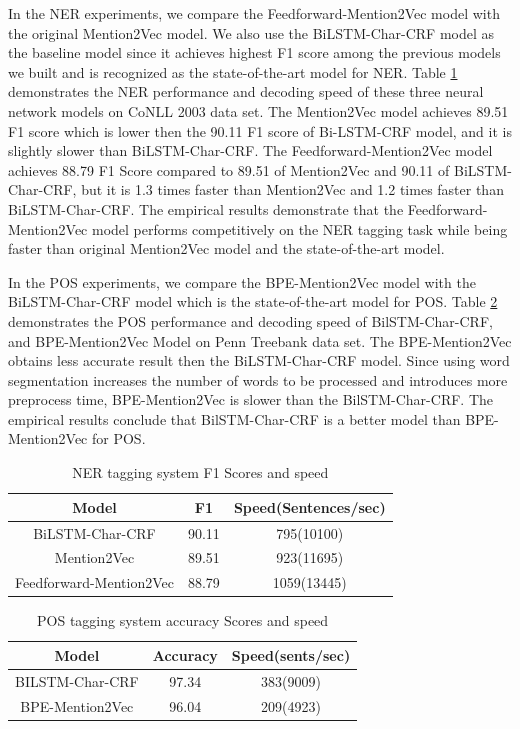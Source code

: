 \documentclass{sfuthesis}
\begin{document}
In the NER experiments, we compare the Feedforward-Mention2Vec model with the original Mention2Vec model. We also use the BiLSTM-Char-CRF model as the baseline model since it achieves highest F1 score among the previous models we built and is recognized as the state-of-the-art model for NER. Table \ref{table:ner-mention2vec} demonstrates the NER performance and decoding speed of these three neural network models on CoNLL 2003 data set. The Mention2Vec model achieves 89.51 F1 score which is lower then the 90.11 F1 score of Bi-LSTM-CRF model, and it is slightly slower than BiLSTM-Char-CRF. The Feedforward-Mention2Vec model achieves 88.79 F1 Score compared to 89.51 of Mention2Vec and 90.11 of BiLSTM-Char-CRF, but it is 1.3 times faster than Mention2Vec and 1.2 times faster than BiLSTM-Char-CRF. The empirical results demonstrate that the Feedforward-Mention2Vec model performs competitively on the NER tagging task while being faster than original Mention2Vec model and the state-of-the-art model.

In the POS experiments, we compare the BPE-Mention2Vec model with the BiLSTM-Char-CRF model which is the state-of-the-art model for POS. Table \ref{table:pos-mention2vec} demonstrates the POS performance and decoding speed of BilSTM-Char-CRF, and BPE-Mention2Vec Model on Penn Treebank data set. The BPE-Mention2Vec obtains less accurate result then the BiLSTM-Char-CRF model. Since using word segmentation increases the number of words to be processed and introduces more preprocess time, BPE-Mention2Vec is slower than the BilSTM-Char-CRF. The empirical results conclude that BilSTM-Char-CRF is a better model than BPE-Mention2Vec for POS. 

\begin{table}[]
\centering
\caption{NER tagging system F1 Scores and speed }
\label{table:ner-mention2vec}
\begin{tabular}{|c|c|c|}
\hline
Model            & F1     & Speed(Sentences/sec)        \\ \hline
BiLSTM-Char-CRF & 90.11  & 795(10100)            \\ \hline
Mention2Vec  & 89.51     & 923(11695)              \\ \hline
Feedforward-Mention2Vec      & 88.79  &  1059(13445)                   \\ \hline
\end{tabular}
\end{table}

\begin{table}[]
\centering
\caption{POS tagging system accuracy Scores and speed}
\label{table:pos-mention2vec}
\begin{tabular}{|c|c|c|}
\hline
Model            & Accuracy     & Speed(sents/sec)        \\ \hline
BILSTM-Char-CRF & 97.34  & 383(9009)                  \\ \hline
BPE-Mention2Vec      & 96.04  & 209(4923)                   \\ \hline
\end{tabular}
\end{table}
\end{document}
